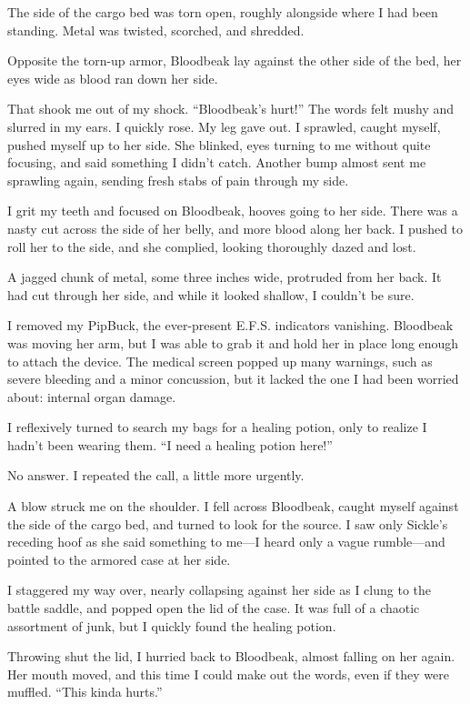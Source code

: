 The side of the cargo bed was torn open, roughly alongside where I had been standing. Metal was twisted, scorched, and shredded.

Opposite the torn-up armor, Bloodbeak lay against the other side of the bed, her eyes wide as blood ran down her side.

That shook me out of my shock. “Bloodbeak’s hurt!” The words felt mushy and slurred in my ears. I quickly rose. My leg gave out. I sprawled, caught myself, pushed myself up to her side. She blinked, eyes turning to me without quite focusing, and said something I didn’t catch. Another bump almost sent me sprawling again, sending fresh stabs of pain through my side.

I grit my teeth and focused on Bloodbeak, hooves going to her side. There was a nasty cut across the side of her belly, and more blood along her back. I pushed to roll her to the side, and she complied, looking thoroughly dazed and lost.

A jagged chunk of metal, some three inches wide, protruded from her back. It had cut through her side, and while it looked shallow, I couldn’t be sure.

I removed my PipBuck, the ever-present E.F.S. indicators vanishing. Bloodbeak was moving her arm, but I was able to grab it and hold her in place long enough to attach the device. The medical screen popped up many warnings, such as severe bleeding and a minor concussion, but it lacked the one I had been worried about: internal organ damage.

I reflexively turned to search my bags for a healing potion, only to realize I hadn’t been wearing them. “I need a healing potion here!”

No answer. I repeated the call, a little more urgently.

A blow struck me on the shoulder. I fell across Bloodbeak, caught myself against the side of the cargo bed, and turned to look for the source. I saw only Sickle’s receding hoof as she said something to me—I heard only a vague rumble—and pointed to the armored case at her side.

I staggered my way over, nearly collapsing against her side as I clung to the battle saddle, and popped open the lid of the case. It was full of a chaotic assortment of junk, but I quickly found the healing potion.

Throwing shut the lid, I hurried back to Bloodbeak, almost falling on her again. Her mouth moved, and this time I could make out the words, even if they were muffled. “This kinda hurts.”

